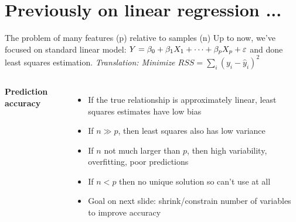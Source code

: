 \documentclass[aspectratio=169,usenames,dvipsnames]{beamer}
\newcommand{\InstructorNotes}[1]{\textit{\color{orange}#1}}
\newcommand{\InstructorList}[1]{
\begin{itemize}
	\color{orange}
	#1
\end{itemize}
}
\begin{document}
\section{Previously on linear regression ...}

\begin{frame}[t]{The problem of many features (p) relative to samples (n)}
	Up to now, we've focused on standard linear model:
		$Y = \beta_0 + \beta_1 X_1 + \cdots + \beta_p X_p + \varepsilon$
	and done least squares estimation.
	\InstructorNotes{Translation: Minimize $RSS = \sum_{i}(y_i-\hat y_i)^2$}
\begin{columns}
\centering
\textbf{Prediction accuracy}
\footnotesize
\InstructorList{
\item If the true relationship is approximately linear, least squares estimates have low bias
\item If $n \gg p$, then least squares also has low variance
\item If $n$ not much larger than $p$, then high variability, overfitting, poor predictions
\item If $n<p$ then no unique solution so can't use at all
\item Goal on next slide: shrink/constrain number of variables to improve accuracy
}
\centering
\end{columns}

\end{frame}
\end{document}
